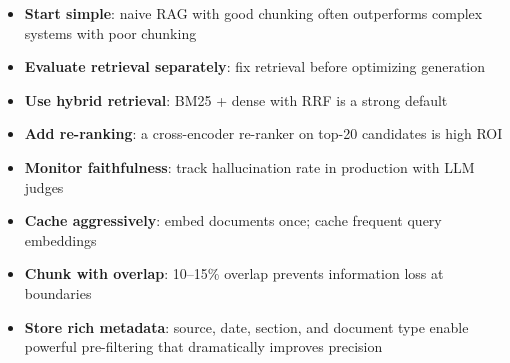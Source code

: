 \begin{keybox}
\begin{itemize}
  \item \textbf{Start simple}: naive RAG with good chunking often outperforms complex systems with poor chunking
  \item \textbf{Evaluate retrieval separately}: fix retrieval before optimizing generation
  \item \textbf{Use hybrid retrieval}: BM25 + dense with RRF is a strong default
  \item \textbf{Add re-ranking}: a cross-encoder re-ranker on top-20 candidates is high ROI
  \item \textbf{Monitor faithfulness}: track hallucination rate in production with LLM judges
  \item \textbf{Cache aggressively}: embed documents once; cache frequent query embeddings
  \item \textbf{Chunk with overlap}: 10--15\% overlap prevents information loss at boundaries
  \item \textbf{Store rich metadata}: source, date, section, and document type enable powerful pre-filtering that dramatically improves precision
\end{itemize}
\end{keybox}

